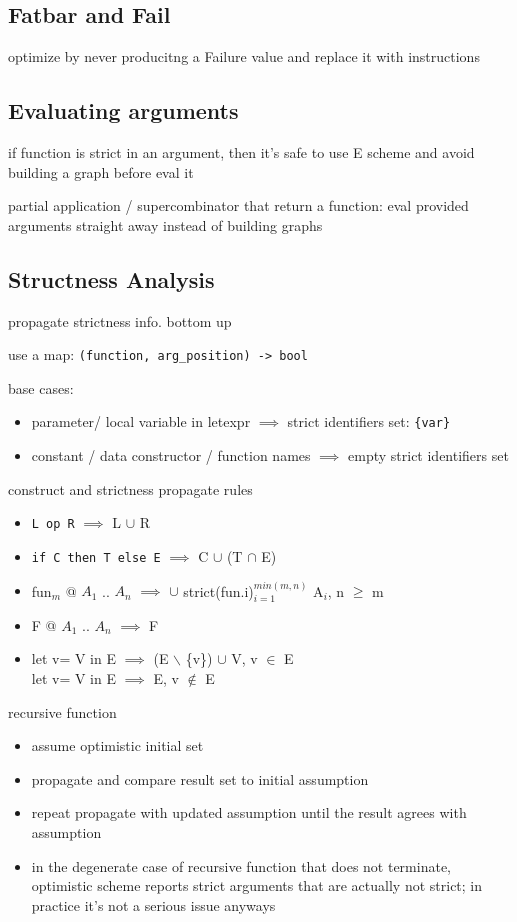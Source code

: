 \documentclass[8pt]{extarticle}
\begin{document}
\begin{multicols*}{2}
\subsection{Fatbar and Fail}
optimize by never producitng a Failure value and replace it with instructions

\subsection{Evaluating arguments}

if function is strict in an argument, then it's safe to use E scheme and avoid building a graph before eval it

partial application / supercombinator that return a function: eval provided arguments straight away instead of building graphs

\subsection{Structness Analysis}
propagate strictness info. bottom up

use a map: \verb|(function, arg_position) -> bool|

base cases:
\begin{itemize}
\item parameter/ local variable in letexpr $\implies$ strict identifiers set: \verb|{var}|
\item constant / data constructor / function names $\implies$ empty strict identifiers set
\end{itemize}

construct and strictness propagate rules
\begin{itemize}
\item \verb|L op R| $\implies$ L $\cup$ R
\item \verb|if C then T else E| $\implies$ C $\cup$ (T $\cap$ E)
\item fun$_m$ @ $A_1$ .. $A_n$ $\implies$ $\cup$ strict(fun.i)$_{i=1}^{min(m,n)}$ A$_i$, n $\geq$ m
\item F @ $A_1$ .. $A_n$ $\implies$ F
\item let v= V in E $\implies$ (E $\backslash$ \{v\}) $\cup$ V, v $\in$ E\\
  let v= V in E $\implies$ E, v $\not\in$ E
\end{itemize}

recursive function
\begin{itemize}
\item assume optimistic initial set
\item propagate and compare result set to initial assumption
\item repeat propagate with updated assumption until the result agrees with assumption
\item in the degenerate case of recursive function that does not terminate, optimistic scheme reports strict arguments that are actually not strict; in practice it's not a serious issue anyways
\end{itemize}


\end{multicols*}
\end{document}
